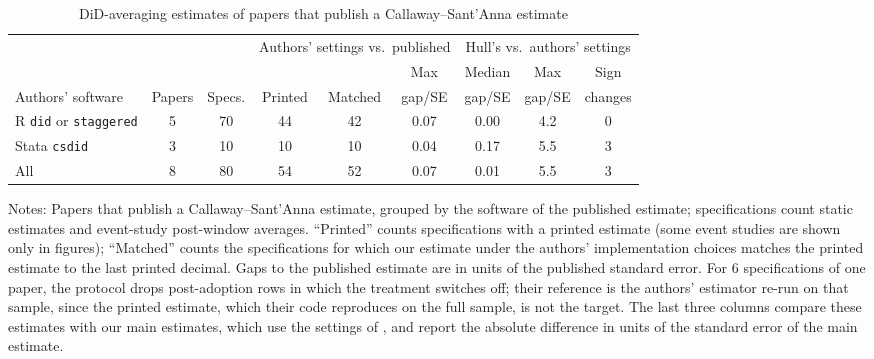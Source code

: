 \begin{table}[htbp]\centering
\caption{DiD-averaging estimates of papers that publish a Callaway--Sant'Anna estimate}\label{tab:pubcs}
\footnotesize
\setlength{\tabcolsep}{4pt}
\begin{tabular}{lcccccccc}
\toprule
 & & & \multicolumn{3}{c}{Authors' settings vs.\ published} & \multicolumn{3}{c}{Hull's vs.\ authors' settings} \\
\cmidrule(lr){4-6}\cmidrule(lr){7-9}
 & & & & & Max & Median & Max & Sign \\
Authors' software & Papers & Specs. & Printed & Matched & gap/SE & gap/SE & gap/SE & changes \\
\midrule
R \texttt{did} or \texttt{staggered} & 5 & 70 & 44 & 42 & 0.07 & 0.00 & 4.2 & 0 \\
Stata \texttt{csdid} & 3 & 10 & 10 & 10 & 0.04 & 0.17 & 5.5 & 3 \\
\midrule
All & 8 & 80 & 54 & 52 & 0.07 & 0.01 & 5.5 & 3 \\
\bottomrule
\end{tabular}
\par\smallskip
\begin{minipage}{0.95\textwidth}
{\footnotesize\noindent Notes: Papers that publish a Callaway--Sant'Anna estimate, grouped by the software of the published estimate; specifications count static estimates and event-study post-window averages. ``Printed'' counts specifications with a printed estimate (some event studies are shown only in figures); ``Matched'' counts the specifications for which our estimate under the authors' implementation choices matches the printed estimate to the last printed decimal. Gaps to the published estimate are in units of the published standard error. For 6 specifications of one paper, the protocol drops post-adoption rows in which the treatment switches off; their reference is the authors' estimator re-run on that sample, since the printed estimate, which their code reproduces on the full sample, is not the target. The last three columns compare these estimates with our main estimates, which use the settings of \citet{hull2026}, and report the absolute difference in units of the standard error of the main estimate.\par}
\end{minipage}
\end{table}
